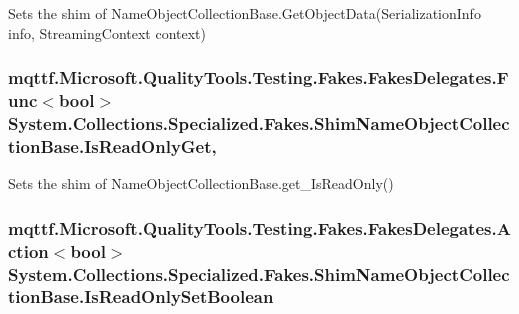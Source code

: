 Sets the shim of Name\-Object\-Collection\-Base.\-Get\-Object\-Data(\-Serialization\-Info info, Streaming\-Context context)

\hypertarget{class_system_1_1_collections_1_1_specialized_1_1_fakes_1_1_shim_name_object_collection_base_a0783d303994e7dce6e7e2a78ddae2ff7}{
\subsubsection[{Is\-Read\-Only\-Get}]{\setlength{\rightskip}{0pt plus 5cm}mqttf.\-Microsoft.\-Quality\-Tools.\-Testing.\-Fakes.\-Fakes\-Delegates.\-Func$<$bool$>$ System.\-Collections.\-Specialized.\-Fakes.\-Shim\-Name\-Object\-Collection\-Base.\-Is\-Read\-Only\-Get\hspace{0.3cm}{\ttfamily [get]}, {\ttfamily [set]}}}\label{class_system_1_1_collections_1_1_specialized_1_1_fakes_1_1_shim_name_object_collection_base_a0783d303994e7dce6e7e2a78ddae2ff7}


Sets the shim of Name\-Object\-Collection\-Base.\-get\-\_\-\-Is\-Read\-Only()

\hypertarget{class_system_1_1_collections_1_1_specialized_1_1_fakes_1_1_shim_name_object_collection_base_ae5d9367630963bb2031f4d10fc5322be}{
\subsubsection[{Is\-Read\-Only\-Set\-Boolean}]{\setlength{\rightskip}{0pt plus 5cm}mqttf.\-Microsoft.\-Quality\-Tools.\-Testing.\-Fakes.\-Fakes\-Delegates.\-Action$<$bool$>$ System.\-Collections.\-Specialized.\-Fakes.\-Shim\-Name\-Object\-Collection\-Base.\-Is\-Read\-Only\-Set\-Boolean\hspace{0.3cm}{\ttfamily [set]}}}\label{class_system_1_1_collections_1_1_specialized_1_1_fakes_1_1_shim_name_object_collection_base_ae5d9367630963bb2031f4d10fc5322be}


